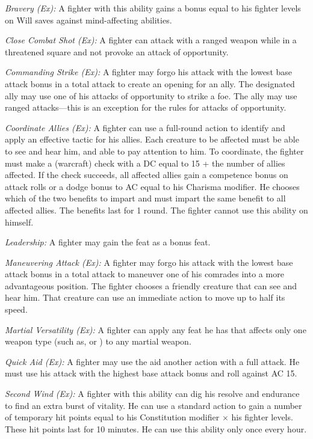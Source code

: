 \textit{Bravery (Ex):} A fighter with this ability gains a bonus equal to \onehalf his fighter levels on Will saves against mind-affecting abilities.

\textit{Close Combat Shot (Ex):} A fighter can attack with a ranged weapon while in a threatened square and not provoke an attack of opportunity.

\textit{Commanding Strike (Ex):} A fighter may forgo his attack with the lowest base attack bonus in a total attack to create an opening for an ally. The designated ally may use one of his attacks of opportunity to strike a foe. The ally may use ranged attacks---this is an exception for the rules for attacks of opportunity.

\textit{Coordinate Allies (Ex):} A fighter can use a full-round action to identify and apply an effective tactic for his allies. Each creature to be affected must be able to see and hear him, and able to pay attention to him. To coordinate, the fighter must make a  (warcraft) check with a DC equal to 15 + the number of allies affected. If the check succeeds, all affected allies gain a competence bonus on attack rolls or a dodge bonus to AC equal to his Charisma modifier. He chooses which of the two benefits to impart and must impart the same benefit to all affected allies. The benefits last for 1 round. The fighter cannot use this ability on himself.

\textit{Leadership:} A fighter may gain the  feat as a bonus feat.

\textit{Maneuvering Attack (Ex):} A fighter may forgo his attack with the lowest base attack bonus in a total attack to maneuver one of his comrades into a more advantageous position. The fighter chooses a friendly creature that can see and hear him. That creature can use an immediate action to move up to half its speed.

\textit{Martial Versatility (Ex):} A fighter can apply any feat he has that affects only one weapon type (such as,  or ) to any martial weapon.

\textit{Quick Aid (Ex):} A fighter may use the aid another action with a full attack. He must use his attack with the highest base attack bonus and roll against AC 15.

\textit{Second Wind (Ex):} A fighter with this ability can dig his resolve and endurance to find an extra burst of vitality. He can use a standard action to gain a number of temporary hit points equal to his Constitution modifier $\times$ his fighter levels. These hit points last for 10 minutes. He can use this ability only once every hour.

